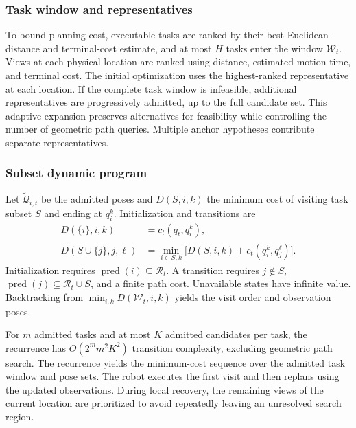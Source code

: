 \documentclass[letterpaper,10pt,journal]{IEEEtran}
\begin{document}
\subsubsection{Task window and representatives}
To bound planning cost, executable tasks are ranked by their best Euclidean-distance and terminal-cost estimate, and at most $H$ tasks enter the window $\mathcal W_t$. Views at each physical location are ranked using distance, estimated motion time, and terminal cost. The initial optimization uses the highest-ranked representative at each location. If the complete task window is infeasible, additional representatives are progressively admitted, up to the full candidate set. This adaptive expansion preserves alternatives for feasibility while controlling the number of geometric path queries. Multiple anchor hypotheses contribute separate representatives.

\subsubsection{Subset dynamic program}
Let $\widetilde{\mathcal Q}_{i,t}$ be the admitted poses and $D(S,i,k)$ the minimum cost of visiting task subset $S$ and ending at $q_i^k$. Initialization and transitions are
\begin{equation}
\begin{aligned}
D(\{i\},i,k)&=c_t(q_t,q_i^k),\\
D(S\cup\{j\},j,\ell)&=\min_{i\in S,k}
\bigl[D(S,i,k)+c_t(q_i^k,q_j^\ell)\bigr].
\end{aligned}
\label{eq:subset-dp}
\end{equation}
Initialization requires $\operatorname{pred}(i)\subseteq\mathcal R_t$. A transition requires $j\notin S$, $\operatorname{pred}(j)\subseteq\mathcal R_t\cup S$, and a finite path cost. Unavailable states have infinite value. Backtracking from $\min_{i,k}D(\mathcal W_t,i,k)$ yields the visit order and observation poses.

For $m$ admitted tasks and at most $K$ admitted candidates per task, the recurrence has $O(2^m m^2K^2)$ transition complexity, excluding geometric path search. The recurrence yields the minimum-cost sequence over the admitted task window and pose sets. The robot executes the first visit and then replans using the updated observations. During local recovery, the remaining views of the current location are prioritized to avoid repeatedly leaving an unresolved search region.
\end{document}
